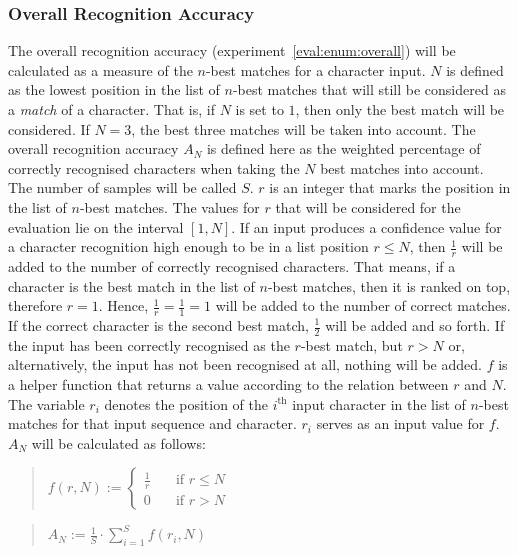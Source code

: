 \subsubsection{Overall Recognition Accuracy}
\label{sec:eval:overallrecognitionaccuracy}

The overall recognition accuracy (experiment~\ref{eval:enum:overall}) will 
be calculated as a measure of the \(n\)-best matches for a character input. 
\(N\) is defined as the lowest position in the list of \(n\)-best matches 
that will still be considered as a \emph{match} of a character. 
That is, if \(N\) is set to \(1\), then only the best match will be considered.
If \(N = 3\), the best three matches will be taken into account.
The overall recognition accuracy \(A_{N}\) is defined here as the weighted 
percentage of correctly recognised characters when taking the \(N\) best 
matches into account. The number of samples will be called \(S\).
\(r\) is an integer that marks the position in the list of \(n\)-best matches.
The values for \(r\) that will be considered for the evaluation lie 
on the interval \([1,N]\). If an input produces a confidence value 
for a character recognition high enough to be in a list position \(r \leq N\), 
then \(\frac{1}{r}\) will be added to the number of correctly 
recognised characters.
That means, if a character is the best match in the list of \(n\)-best matches,
then it is ranked on top, therefore \(r = 1\). 
Hence, \(\frac{1}{r} = \frac{1}{1} = 1\) will be added to the number of 
correct matches. If the correct character is the second best match, 
\(\frac{1}{2}\) will be added and so forth. If the input has been correctly 
recognised as the \(r\)-best match, but \(r > N\) or, alternatively,
the input has not been recognised at all, nothing will be added. 
\(f\) is a helper function that returns a value
according to the relation between \(r\) and \(N\). The variable
\(r_{i}\) denotes the position of the \(i^{\text{th}}\) input character in
the list of \(n\)-best matches for that input sequence and character. \(r_{i}\) serves as an input
value for \(f\). \(A_N\) will be calculated as follows:
\begin{quote}
  \(
    f(r, N):=
    \begin{cases}
      \frac{1}{r} & \quad \text{if $r \leq N$} \\
      0 & \quad \text{if $r > N$}
    \end{cases}
  \)
\end{quote}
\begin{quote}
  \(
    A_N := \frac{1}{S} \cdot \sum\limits_{i=1}^{S}{f(r_{i},N)}
  \)
\end{quote}\label{eval:accuracycalculation}
